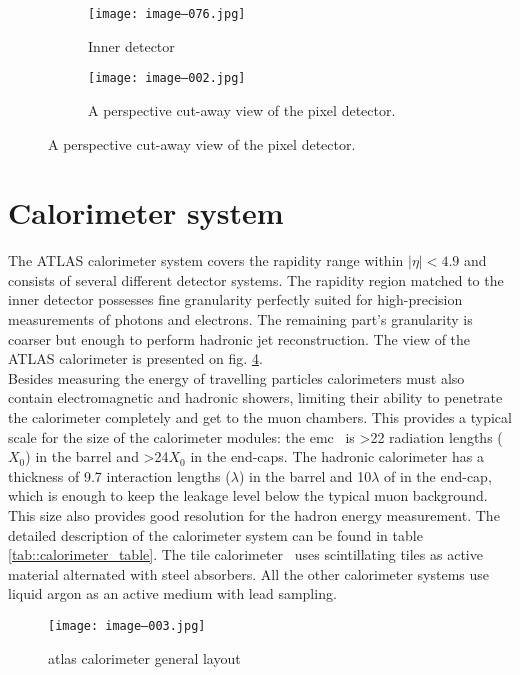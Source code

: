 		\begin{figure}[htbp]
			\begin{subfigure}[t]{0.48\textwidth}
				\texttt{[image: image--076.jpg]}
				\caption[Inner detector]{Inner detector}
				\label{fig::id}
			\end{subfigure}
		                \hfill
			\begin{subfigure}[t]{0.48\textwidth}
				\texttt{[image: image--002.jpg]}
				\caption[Pixel detector]{A perspective cut-away view of the pixel detector.}
				\label{fig::pd}
			\end{subfigure}
			\label{fig::cfrs}
		\end{figure}
        \section{Calorimeter system }
		The ATLAS calorimeter system covers the rapidity range within $|\eta| < 4.9$ and consists of several different detector systems. The rapidity region matched to the inner detector possesses fine granularity perfectly suited for high-precision measurements of photons and electrons. The remaining part's granularity is coarser but enough to perform hadronic jet reconstruction. The view of the ATLAS calorimeter is presented on fig. \ref{fig::calorimeter_layout}.\\
		Besides measuring the energy of travelling particles calorimeters must also contain electromagnetic and hadronic showers, limiting their ability to penetrate the calorimeter completely and get to the muon chambers. This provides a typical scale for the size of the calorimeter modules: the \gls{emc}~\cite{LAr_calo} is >22 radiation lengths ($X_0$) in the barrel and >24$X_0$ in the end-caps. The hadronic calorimeter has a thickness of 9.7 interaction lengths ($\lambda$) in the barrel and 10$\lambda$ of in the end-cap, which is enough to keep the leakage level below the typical muon background. This size also provides good resolution for the hadron energy measurement. The detailed description of the calorimeter system can be found in table \ref{tab::calorimeter_table}.
		The tile calorimeter~\cite{Tile_calo} uses scintillating tiles as active material alternated with steel absorbers. All the other calorimeter systems use liquid argon as an active medium with lead sampling.
        \begin{figure}[htpb]
			\texttt{[image: image--003.jpg]}
			\caption{ \gls{atlas} calorimeter general layout}
			\label{fig::calorimeter_layout}
		\end{figure}
